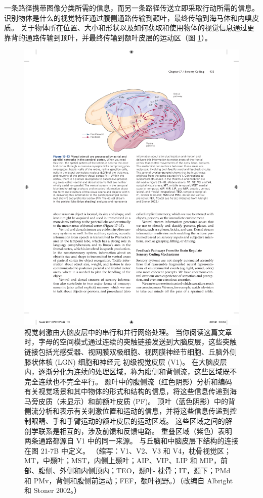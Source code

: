一条路径携带图像分类所需的信息，而另一条路径传送立即采取行动所需的信息。 
识别物体是什么的视觉特征通过腹侧通路传输到颞叶，最终传输到海马体和内嗅皮质。 
关于物体所在位置、大小和形状以及如何获取和使用物体的视觉信息通过更靠背的通路传输到顶叶，并最终传输到额叶皮层的运动区（图 \ref{fig:17_13}）。


\begin{figure}[htbp]
	\centering
	\includegraphics[width=1.0\linewidth]{chap17/fig_17_13}
	\caption{视觉刺激由大脑皮层中的串行和并行网络处理。 
		当你阅读这篇文章时，字母的空间模式通过连续的突触链接发送到大脑皮层，这些突触链接包括光感受器、视网膜双极细胞、视网膜神经节细胞、丘脑外侧膝状体核 (LGN) 细胞和神经元 初级视觉皮层 (V1)。 
		在大脑皮层内，逐渐分化为连续的处理区域，称为腹侧和背侧流，这些区域既不完全连续也不完全平行。 
		颞叶中的腹侧流（红色阴影）分析和编码有关视觉场景和其中物体的形式和结构的信息，将这些信息传递到海马旁皮质（未显示）和前额叶皮质 (PF)。 
		顶叶（蓝色阴影）中的背侧流分析和表示有关刺激位置和运动的信息，并将这些信息传递到控制眼睛、手和手臂运动的额叶皮层的运动区域。 
		这些区域之间的解剖学联系是相互的，涉及前馈和反馈电路。 
		重叠区域（紫色）表明两条通路都源自 V1 中的同一来源。 
		与丘脑和中脑皮层下结构的连接在图 21-7B 中定义。 （缩写：V1、V2、V3 和 V4，枕骨视觉区；MT，中颞叶；MST，内侧上颞叶；AIP、VIP、LIP 和 MIP，前部、腹侧、外侧和内侧顶内；TEO，颞叶- 枕骨；IT，颞下；PMd 和 PMv，背侧和腹侧前运动；FEF，额叶视野。）（改编自 Albright 和 Stoner 2002。）}
	\label{fig:17_13}
\end{figure}

